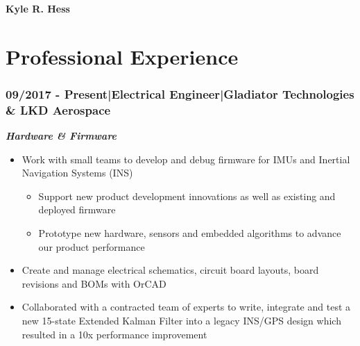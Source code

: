 \documentclass[]{article}
\begin{document}
\begin{singlespace}
\noindent\textbf{\huge{Kyle R. Hess}}
\hfill \break
\noindent\makebox[\linewidth]{\rule{\textwidth}{1pt}}


\section*{Professional Experience}

\subsubsection*{09/2017 - Present\hspace{3 mm}|\hspace{3 mm}Electrical Engineer\hspace{3 mm}|\hspace{3 mm}Gladiator Technologies \& LKD Aerospace}
\textbf{\emph{Hardware \& Firmware}}
\vspace{-2mm}
\begin{itemize}
    \setlength\itemsep{0em}
    \item Work with small teams to develop and debug firmware for IMUs and Inertial Navigation Systems (INS)
    \vspace{-2mm}
    \begin{itemize}
        \setlength\itemsep{0em}
        \item Support new product development innovations as well as existing and deployed firmware
        \item Prototype new hardware, sensors and embedded algorithms to advance our product performance
    \end{itemize}
    \vspace{-1mm}
    \item Create and manage electrical schematics, circuit board layouts, board revisions and BOMs with OrCAD
    \item Collaborated with a contracted team of experts to write, integrate and test a new 15-state Extended Kalman Filter into a legacy INS/GPS design which resulted in a 10x performance improvement
\end{itemize}


\end{singlespace}
\end{document}
